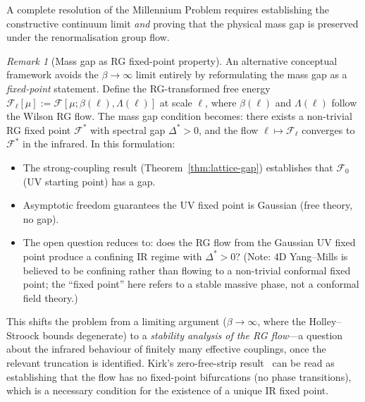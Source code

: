 \documentclass[12pt,a4paper]{article}
\theoremstyle{definition}
\theoremstyle{plain}
\theoremstyle{remark}
\newtheorem{remark}[definition]{Remark}
\begin{document}
A complete resolution of the Millennium Problem requires establishing the constructive continuum limit \emph{and} proving that the physical mass gap is preserved under the renormalisation group flow.

\begin{remark}[Mass gap as RG fixed-point property]\label{rem:rg-fixpoint}
An alternative conceptual framework avoids the $\beta \to \infty$ limit
entirely by reformulating the mass gap as a \emph{fixed-point} statement.
Define the RG-transformed free energy
$\mathcal{F}_\ell[\mu] := \mathcal{F}[\mu; \beta(\ell), \Lambda(\ell)]$
at scale $\ell$, where $\beta(\ell)$ and $\Lambda(\ell)$ follow the
Wilson RG flow. The mass gap condition becomes: there exists a
non-trivial RG fixed point $\mathcal{F}^*$ with spectral gap
$\Delta^* > 0$, and the flow $\ell \mapsto \mathcal{F}_\ell$ converges
to $\mathcal{F}^*$ in the infrared. In this formulation:
\begin{itemize}
  \item The strong-coupling result (Theorem~\ref{thm:lattice-gap}) establishes
    that $\mathcal{F}_0$ (UV starting point) has a gap.
  \item Asymptotic freedom guarantees the UV fixed point is Gaussian
    (free theory, no gap).
  \item The open question reduces to: does the RG flow from the Gaussian
    UV fixed point produce a confining IR regime with $\Delta^* > 0$?
    (Note: 4D Yang--Mills is believed to be confining rather than flowing to a non-trivial conformal fixed point; the ``fixed point'' here refers to a stable massive phase, not a conformal field theory.)
\end{itemize}
This shifts the problem from a limiting argument ($\beta \to \infty$,
where the Holley--Stroock bounds degenerate) to a \emph{stability
analysis of the RG flow}---a question about the infrared behaviour
of finitely many effective couplings, once the relevant truncation
is identified. Kirk's
zero-free-strip result~\cite{Kirk2026b} can be read as establishing
that the flow has no fixed-point bifurcations (no phase transitions),
which is a necessary condition for the existence of a unique IR
fixed point.
\end{remark}
\end{document}

